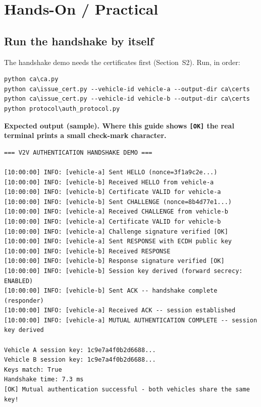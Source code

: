 \documentclass[11pt,a4paper]{report}
\begin{document}
\section{Hands-On / Practical}

\subsection{Run the handshake by itself}
The handshake demo needs the certificates first (Section~S2). Run, in order:
\begin{lstlisting}[style=term]
python ca\ca.py
python ca\issue_cert.py --vehicle-id vehicle-a --output-dir ca\certs
python ca\issue_cert.py --vehicle-id vehicle-b --output-dir ca\certs
python protocol\auth_protocol.py
\end{lstlisting}

\noindent\textbf{Expected output (sample). Where this guide shows \texttt{[OK]}
the real terminal prints a small check-mark character.}
\begin{lstlisting}[style=term]
=== V2V AUTHENTICATION HANDSHAKE DEMO ===

[10:00:00] INFO: [vehicle-a] Sent HELLO (nonce=3f1a9c2e...)
[10:00:00] INFO: [vehicle-b] Received HELLO from vehicle-a
[10:00:00] INFO: [vehicle-b] Certificate VALID for vehicle-a
[10:00:00] INFO: [vehicle-b] Sent CHALLENGE (nonce=8b4d77e1...)
[10:00:00] INFO: [vehicle-a] Received CHALLENGE from vehicle-b
[10:00:00] INFO: [vehicle-a] Certificate VALID for vehicle-b
[10:00:00] INFO: [vehicle-a] Challenge signature verified [OK]
[10:00:00] INFO: [vehicle-a] Sent RESPONSE with ECDH public key
[10:00:00] INFO: [vehicle-b] Received RESPONSE
[10:00:00] INFO: [vehicle-b] Response signature verified [OK]
[10:00:00] INFO: [vehicle-b] Session key derived (forward secrecy: ENABLED)
[10:00:00] INFO: [vehicle-b] Sent ACK -- handshake complete (responder)
[10:00:00] INFO: [vehicle-a] Received ACK -- session established
[10:00:00] INFO: [vehicle-a] MUTUAL AUTHENTICATION COMPLETE -- session key derived

Vehicle A session key: 1c9e7a4f0b2d6688...
Vehicle B session key: 1c9e7a4f0b2d6688...
Keys match: True
Handshake time: 7.3 ms
[OK] Mutual authentication successful - both vehicles share the same key!
\end{lstlisting}
\end{document}
